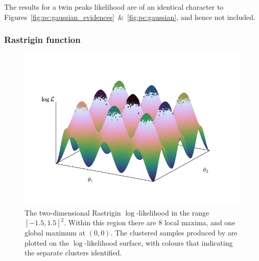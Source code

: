 The results for a twin peaks likelihood are of an identical character to Figures~\ref{fig:pc:gaussian_evidences}~\&~\ref{fig:pc:gaussian}, and hence not included.

\subsubsection{Rastrigin function}
\label{sec:pc:rastrigin}

\begin{figure}[tp]
  \centering
  \includegraphics[width=\columnwidth]{chapters/polychord/figures/rastrigin}
  \caption{The two-dimensional Rastrigin \(\log\)-likelihood in the range \({[-1.5,1.5]}^2\). Within this region there are \(8\) local maxima, and one global maximum at \((0,0)\). The clustered samples produced by \PolyChord{} are plotted on the \(\log\)-likelihood surface, with colours that indicating the separate clusters identified.\label{fig:pc:rastrigin}}
\end{figure}

